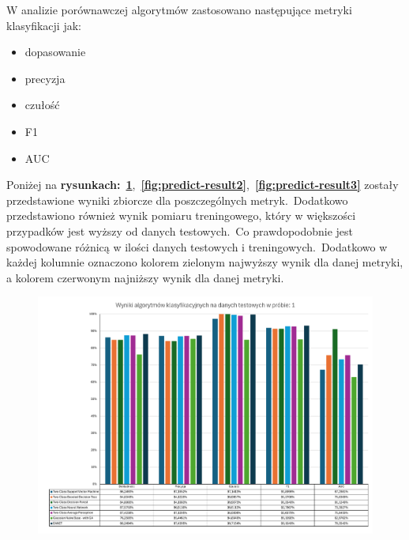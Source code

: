 W analizie porównawczej algorytmów zastosowano następujące metryki klasyfikacji jak:
\begin{itemize}
    \item dopasowanie
    \item precyzja
    \item czułość
    \item F1
    \item AUC
\end{itemize}

Poniżej na \textbf{rysunkach:}~\textbf{\ref{fig:predict-result}},~\textbf{\ref{fig:predict-result2}},~\textbf{\ref{fig:predict-result3}} zostały przedstawione wyniki zbiorcze dla poszczególnych metryk.\ Dodatkowo przedstawiono również wynik pomiaru treningowego, który w większości przypadków jest wyższy od danych testowych.\ Co prawdopodobnie jest spowodowane różnicą w ilości danych testowych i treningowych.\ Dodatkowo w każdej kolumnie oznaczono kolorem zielonym najwyższy wynik dla danej metryki, a kolorem czerwonym najniższy wynik dla danej metryki.

\begin{landscape}
    \vspace*{\fill}
    \begin{figure}[H]
        \centering
        \includegraphics[height=0.8\textwidth]{images/predict_result}
        \label{fig:predict-result}
    \end{figure}
    \vfill
\end{landscape}

